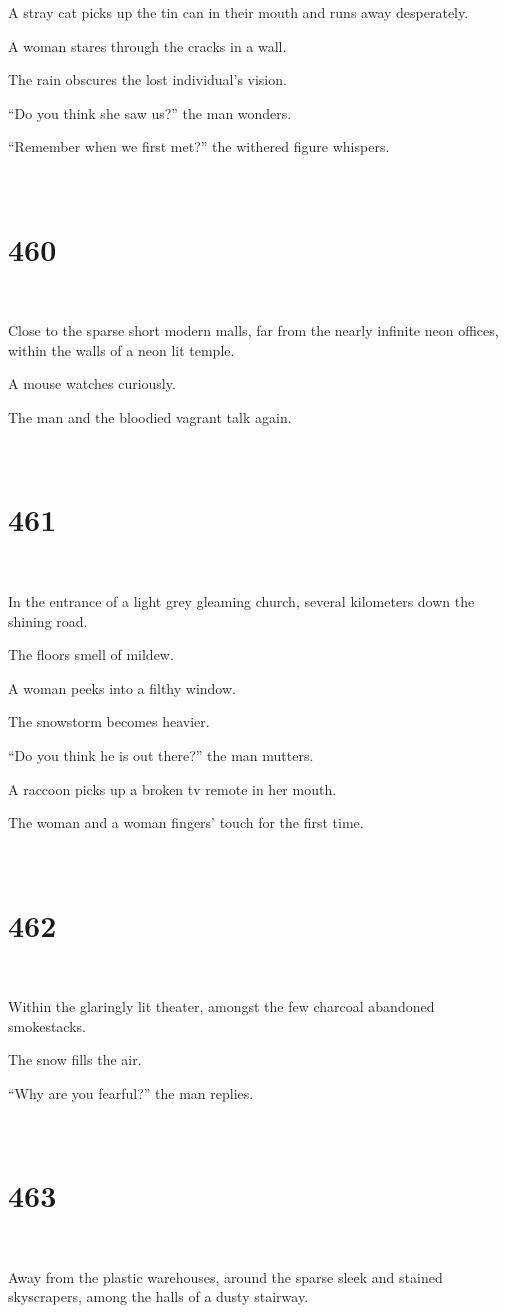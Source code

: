 \documentclass{report}
\begin{document}
A stray cat picks up the tin can in their mouth and runs away desperately.

A woman stares through the cracks in a wall.

The rain obscures the lost individual's vision.

``Do you think she saw us?'' the man wonders.

``Remember when we first met?'' the withered figure whispers.

~
\chapter*{460}
~

Close to the sparse short modern malls, far from the nearly infinite neon offices, within the walls of a neon lit temple.

A mouse watches curiously.

The man and the bloodied vagrant talk again.

~
\chapter*{461}
~

In the entrance of a light grey gleaming church, several kilometers down the shining road.

The floors smell of mildew.

A woman peeks into a filthy window.

The snowstorm becomes heavier.

``Do you think he is out there?'' the man mutters.

A raccoon picks up a broken tv remote in her mouth.

The woman and a woman fingers' touch for the first time.

~
\chapter*{462}
~

Within the glaringly lit theater, amongst the few charcoal abandoned smokestacks.

The snow fills the air.

``Why are you fearful?'' the man replies.

~
\chapter*{463}
~

Away from the plastic warehouses, around the sparse sleek and stained skyscrapers, among the halls of a dusty stairway.
\end{document}
